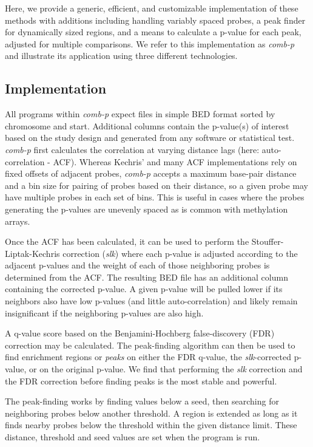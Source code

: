 \documentclass{bioinfo}
\begin{document}
Here, we provide a generic, efficient, and customizable implementation
of these methods with additions including handling variably spaced
probes, a peak finder for dynamically sized regions, and a means to
calculate a p-value for each peak, adjusted for multiple
comparisons. We refer to this implementation as \textit{comb-p} and
illustrate its application using three different technologies.

\begin{methods}

\section{Implementation}

All programs within \textit{comb-p} expect files in simple BED format
\citep{Kent2002} sorted by chromosome and start.
Additional columns contain the p-value(s) of interest based on the
study design and generated from any software or statistical test.
\textit{comb-p} first
calculates the correlation at varying distance lags (here: auto-correlation - ACF).
 Whereas Kechris'
\citep{Kechris2010} and many ACF implementations rely on fixed offsets
of adjacent probes, \textit{comb-p} accepts a maximum base-pair
distance and a bin size for pairing of probes based on their distance,
so a given probe may have multiple probes in each set of
bins. This is useful in cases where the probes generating the p-values
are unevenly spaced as is common with methylation arrays.

Once the ACF has been calculated, it can be used to perform the
Stouffer-Liptak-Kechris correction (\textit{slk}) where each p-value is
adjusted according to the adjacent p-values and the weight of each of
those neighboring probes is determined from the ACF. The resulting BED file
has an additional column containing the corrected p-value.
A given p-value will be pulled lower if its neighbors also have low
p-values (and little auto-correlation) and likely remain insignificant if the
neighboring p-values are also high.

A q-value score based on the Benjamini-Hochberg false-discovery (FDR)
correction may be calculated. The peak-finding algorithm can then be
used to find enrichment regions or \textit{peaks} on either the FDR
q-value, the \textit{slk}-corrected p-value, or on the original
p-value.  We find that performing the \textit{slk} correction and the
FDR correction before finding peaks is the most stable and
powerful.

The peak-finding works by finding values below a seed, then searching
for neighboring probes below another threshold. A region is extended
as long as it finds nearby probes below the threshold within the given
distance limit. These distance, threshold and seed values are set when
the program is run.


\end{methods}
\end{document}
